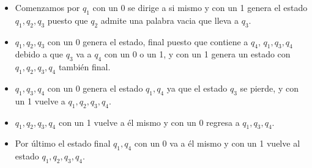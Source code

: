 \documentclass{article}
\begin{document}
 \begin{itemize}
 \item Comenzamos por $q_1$ con un 0 se dirige a si mismo y con un 1 genera el estado $q_1,q_2,q_3$ puesto que $q_2$ admite una palabra vacia que lleva a $q_3$.
 \item $q_1,q_2,q_3$ con un 0 genera el estado, final puesto que contiene a $q_4$, $q_1,q_3,q_4$ debido a que $q_3$ va a $q_4$ con un 0 o un 1, y con un 1 genera un estado con $q_1,q_2,q_3,q_4$ también final.
 \item $q_1,q_3,q_4$ con un 0 genera el estado $q_1,q_4$ ya que el estado $q_3$ se pierde, y con un 1 vuelve a $q_1,q_2,q_3,q_4$.
 \item $q_1,q_2,q_3,q_4$ con un 1 vuelve a él mismo y con un 0 regresa a $q_1,q_3,q_4$.
 \item Por último el estado final $q_1,q_4$ con un 0 va a él mismo y con un 1 vuelve al estado $q_1,q_2,q_3,q_4$.
 \end{itemize}
\end{document}
